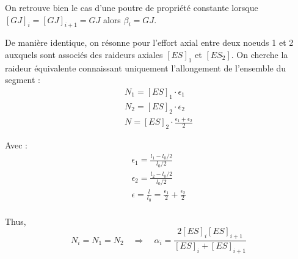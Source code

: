 {On retrouve bien le cas d'une poutre de propriété constante lorsque $[GJ]_i= [GJ]_{i+1} = GJ$ alors $\beta_i = GJ$.


De manière identique, on résonne pour l'effort axial entre deux noeuds 1 et 2 auxquels sont associés des raideurs axiales $[ES]_1$ et $[ES_2]$. On cherche la raideur équivalente connaissant uniquement l'allongement de l'ensemble du segment :
\begin{subequations}
	\begin{gather}
	N_1 = [ES]_1 \cdot \epsilon_1 \\
	N_2 = [ES]_2 \cdot \epsilon_2 \\
	N =  [ES]_2 \cdot \frac{\epsilon_1 + \epsilon_2}{2}
	\end{gather}
\end{subequations}

Avec :
\begin{subequations}
	\begin{gather}
	\epsilon_1 = \frac{l_1 - l_0/2}{l_0/2} \\
	\epsilon_2 = \frac{l_2 - l_0/2}{l_0/2} \\
	\epsilon = \frac{l}{l_0} = \frac{\epsilon_1}{2} + \frac{\epsilon_2}{2}  \\
	\end{gather}
\end{subequations}

Thus,
 \begin{equation}
	N_i = N_1 = N_2 \quad \Rightarrow \quad  \alpha_i = \frac{2 [ES]_i [ES]_{i+1}}{[ES]_i + [ES]_{i+1}}
\end{equation}


 }

